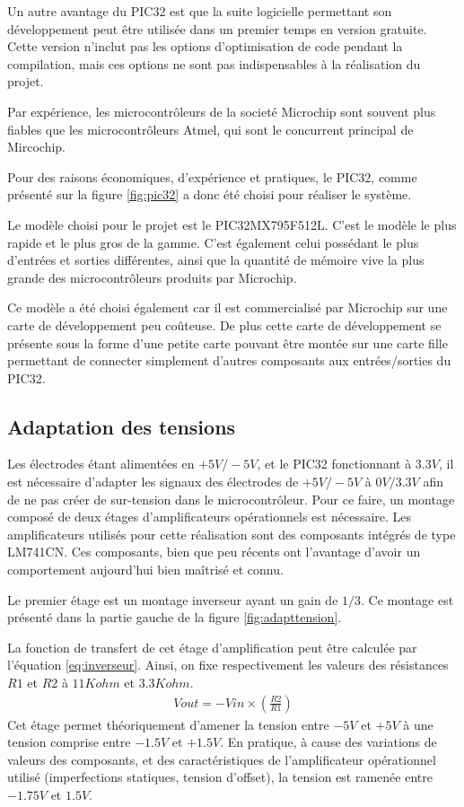 \documentclass[letterpaper, twoside, 12pt, memoire, creativecommons, hyperref]{thETS}
\begin{document}
Un autre avantage du PIC32 est que la suite logicielle permettant son développement peut être utilisée dans un premier temps en version gratuite. Cette version n'inclut pas les options d'optimisation de code pendant la compilation, mais ces options ne sont pas indispensables à la réalisation du projet. 

Par expérience, les microcontrôleurs de la societé Microchip sont souvent plus fiables que les microcontrôleurs Atmel, qui sont le concurrent principal de Mircochip.

Pour des raisons économiques, d'expérience et pratiques, le PIC32, comme présenté sur la figure \ref{fig:pic32} a donc été choisi pour réaliser le système.
 
Le modèle choisi pour le projet est le PIC32MX795F512L. C'est le modèle le plus rapide et le plus gros de la gamme. C'est également celui possédant le plus d'entrées et sorties différentes, ainsi que la quantité de mémoire vive la plus grande des microcontrôleurs produits par Microchip.

Ce modèle a été choisi également car il est commercialisé par Microchip sur une carte de développement peu coûteuse. De plus cette carte de développement se présente sous la forme d'une petite carte pouvant être montée sur une carte fille permettant de connecter simplement d'autres composants aux entrées/sorties du PIC32. 


\subsection{Adaptation des tensions}

Les électrodes étant alimentées en $+5V/-5V$, et le PIC32 fonctionnant à $3.3V$, il est nécessaire d’adapter les signaux des électrodes de $+5V/-5V$ à $0V/3.3V$ afin de ne pas créer de sur-tension dans le microcontrôleur. Pour ce faire, un montage composé de deux étages d'amplificateurs opérationnels est nécessaire.  Les amplificateurs utilisés pour cette réalisation sont des composants intégrés de type LM741CN. Ces composants, bien que peu récents ont l'avantage d'avoir un comportement aujourd'hui bien maîtrisé et connu. 

Le premier étage est un montage inverseur ayant un gain de $1/3$. Ce montage est présenté dans la partie gauche de la figure \ref{fig:adapttension}.

La fonction de transfert de cet étage d'amplification peut être calculée par l'équation \ref{eq:inverseur}. Ainsi, on fixe respectivement les valeurs des résistances $R1$ et $R2$ à $11Kohm$ et $3.3Kohm$.
\begin{align}\label{eq:inverseur}
   Vout = -Vin \times ( \frac{R2}{R1} )
\end{align}
Cet étage permet théoriquement d'amener la tension entre $-5V$ et $+5V$ à une tension comprise entre $-1.5V$ et $+1.5V$. En pratique, à cause des variations de valeurs des composants, et des caractéristiques de l'amplificateur opérationnel utilisé (imperfections statiques, tension d'offset), la tension est ramenée entre $-1.75V$ et $1.5V$.
\end{document}
